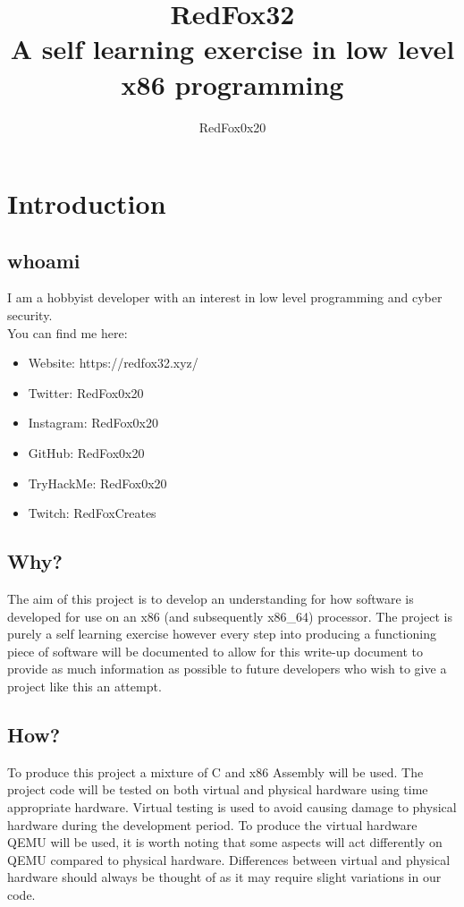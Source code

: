 \documentclass[10pt,a4paper]{article}
\title{RedFox32\\A self learning exercise in low level x86 programming}
\author{RedFox0x20}
\begin{document}

\begin{titlepage}
\maketitle
\end{titlepage}


\tableofcontents
\listoffigures
\newpage

\section{Introduction}
\subsection{whoami}
I am a hobbyist developer with an interest in low level programming and cyber security.
\\
You can find me here:
\begin{itemize}
	\item Website: https://redfox32.xyz/
	\item Twitter: RedFox0x20
	\item Instagram: RedFox0x20
	\item GitHub: RedFox0x20
	\item TryHackMe: RedFox0x20
	\item Twitch: RedFoxCreates
\end{itemize}
\subsection{Why?}

The aim of this project is to develop an understanding for how software is developed for use on an x86 (and subsequently x86\_64) processor. The project is purely a self learning exercise however every step into producing a functioning piece of software will be documented to allow for this write-up document to provide as much information as possible to future developers who wish to give a project like this an attempt.

\subsection{How?}
To produce this project a mixture of C and x86 Assembly will be used. The project code will be tested on both virtual and physical hardware using time appropriate hardware. Virtual testing is used to avoid causing damage to physical hardware during the development period. To produce the virtual hardware QEMU will be used, it is worth noting that some aspects will act differently on QEMU compared to physical hardware. Differences between virtual and physical hardware should always be thought of as it may require slight variations in our code.
\end{document}
